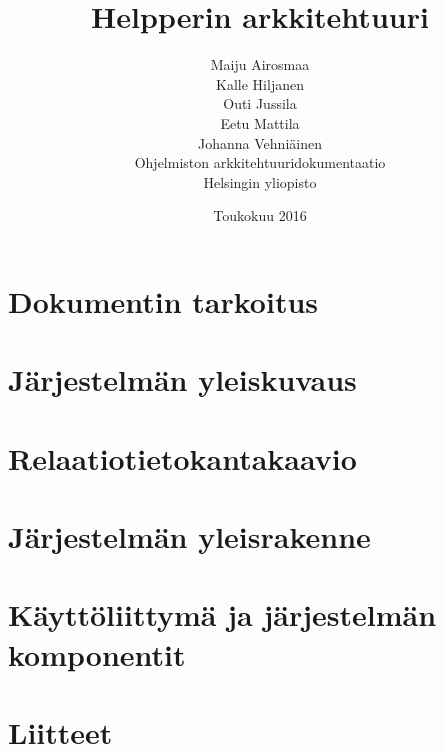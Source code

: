 \documentclass[a4paper,12pt, titlepage]{article}
\title{Helpperin arkkitehtuuri}
\author{ Maiju Airosmaa \\ Kalle Hiljanen \\
Outi Jussila \\ Eetu Mattila \\ Johanna Vehniäinen \\[1cm] Ohjelmiston arkkitehtuuridokumentaatio \\ Helsingin yliopisto}
\date{Toukokuu 2016}
\begin{document}
\maketitle

\tableofcontents

\section{Dokumentin tarkoitus}

\section{Järjestelmän yleiskuvaus}

\section{Relaatiotietokantakaavio}

\section{Järjestelmän yleisrakenne}

\section{Käyttöliittymä ja järjestelmän komponentit}

\section{Liitteet}
\end{document}

